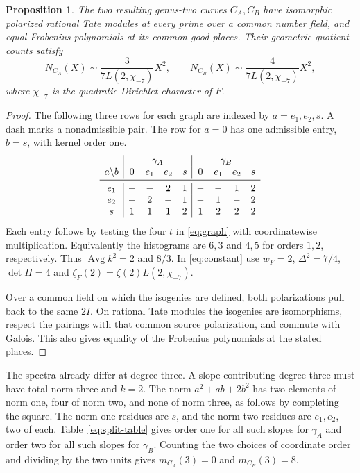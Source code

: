 \documentclass[11pt,letterpaper]{amsart}
\newtheorem{proposition}[theorem]{Proposition}
\theoremstyle{definition}
\numberwithin{equation}{section}
\newcommand{\av}{\operatorname{Avg}}
\begin{document}
\begin{proposition}\label{prop:minus7}
The two resulting genus-two curves \(C_A,C_B\) have isomorphic
polarized rational Tate modules at every prime over a common number
field, and equal Frobenius polynomials at its common good places.
Their geometric quotient counts satisfy
\[
 N_{C_A}(X)\sim \frac{3}{7L(2,\chi_{-7})}X^2,\qquad
 N_{C_B}(X)\sim \frac{4}{7L(2,\chi_{-7})}X^2 ,
\]
where \(\chi_{-7}\) is the quadratic Dirichlet character of \(F\).
\end{proposition}

\begin{proof}
The following three rows for each graph are indexed by \(a=e_1,e_2,s\).
A dash marks a nonadmissible pair. The row for \(a=0\) has one
admissible entry, \(b=s\), with kernel order one.
\begin{equation}\label{eq:split-table}
\begin{array}{c|cccc|cccc}
 &\multicolumn{4}{c|}{\gamma_A}&\multicolumn{4}{c}{\gamma_B}\\
 a\backslash b&0&e_1&e_2&s&0&e_1&e_2&s\\ \midrule
 e_1 & -&-&2&1&-&-&1&2\\
 e_2 & -&2&-&1&-&1&-&2\\
 s   & 1&1&1&2&1&2&2&2
\end{array}
\end{equation}
Each entry follows by testing the four \(t\) in \eqref{eq:graph}
with coordinatewise multiplication. Equivalently the histograms
are \(6,3\) and \(4,5\) for orders \(1,2\), respectively.
Thus \(\av k^2=2\) and \(8/3\). In \eqref{eq:constant} use
\(w_F=2\), \(\Delta^2=7/4\), \(\det H=4\) and
\(\zeta_F(2)=\zeta(2)L(2,\chi_{-7})\).

Over a common field on which the isogenies are defined, both
polarizations pull back to the same \(2I\). On rational Tate modules
the isogenies are isomorphisms, respect the pairings with that
common source polarization, and commute with Galois. This also
gives equality of the Frobenius polynomials at the stated places.
\end{proof}

The spectra already differ at degree three. A slope contributing
degree three must have total norm three and \(k=2\).
The norm \(a^2+ab+2b^2\) has two elements of norm one,
four of norm two, and none of norm three, as follows by completing
the square. The norm-one residues are \(s\), and the norm-two
residues are \(e_1,e_2\), two of each. Table~\eqref{eq:split-table}
gives order one for all such slopes for \(\gamma_A\) and order two
for all such slopes for \(\gamma_B\). Counting the two choices
of coordinate order and dividing by the two units gives
\(m_{C_A}(3)=0\) and \(m_{C_B}(3)=8\).
\end{document}
